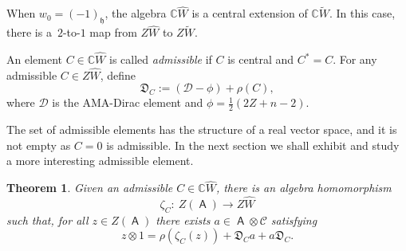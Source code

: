 \documentclass[10pt,a4paper]{amsart}
\numberwithin{equation}{section}
\newtheorem{Theorem}{Theorem}[section]
\newcommand{\fh}{\mathfrak{h}}
\newcommand{\bbc}{\mathbb{C}}
\DeclareMathOperator{\ama}{\mathsf{A}}
\begin{document}
When $w_0 = (-1)_\fh$, the algebra $\bbc \hat{W}$ is a central extension of $\bbc \tilde{W}$. In this case, there is a~$2$-to-$1$ map from $Z\hat{W}$ to $Z\tilde{W}$.

\begin{Definition}\label{d:Dirac_C}
An element $C\in \bbc\hat W$ is called {\it admissible} if $C$ is central and $C^* = C$. For any admissible $C\in Z\hat{W}$, define
\begin{equation}\label{e:CDirac}
\mathfrak{D}_C := (\mathcal{D} - \phi) + \rho(C),
\end{equation}
where $\mathcal{D}$ is the AMA-Dirac element and $\phi = \tfrac{1}{2}(2Z + n -2)$.
\end{Definition}

\begin{Remark}
The set of admissible elements has the structure of a real vector space,
and it is not empty as $C=0$ is admissible.
In the next section we shall exhibit and study a more interesting admissible element.
\end{Remark}


\begin{Theorem}\label{t:Vogan}
Given an admissible $C \in \bbc\hat W$, there is an algebra homomorphism
\[
\zeta_C\colon \ Z(\ama) \to Z\hat W
\]
such that, for all $z \in Z(\ama)$ there exists $a\in \ama\otimes \mathcal{C}$ satisfying
\[
z\otimes 1 = \rho(\zeta_C(z)) + \mathfrak{D}_Ca + a\mathfrak{D}_C.
\]
\end{Theorem}
\end{document}
